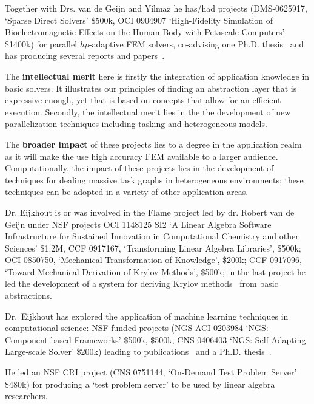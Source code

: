 
Together with Drs. van de Geijn and Yilmaz he has/had projects 
%
(DMS-0625917, `Sparse Direct Solvers' \$500k,
%
OCI 0904907 `High-Fidelity Simulation of Bioelectromagnetic Effects on the Human Body with Petascale Computers' \$1400k)
%
for parallel $hp$-adaptive FEM solvers,
co-advising one Ph.D. thesis~\cite{Kim:2013:dissertation} and has
producing several reports and
papers~\cite{Bientinesi:2010uhm,KimEijkhout:2012Sparse,KimEijkhout:2012GPU,Kim:2013:multilevel}.

The \textbf{intellectual merit} here is firstly the integration of application
knowledge in basic solvers. It illustrates our principles of finding an abstraction
layer that is expressive enough, yet that is based on concepts that allow for 
an efficient execution. Secondly, the intellectual merit lies in the
the development of new parallelization techniques
including tasking and heterogeneous models.

The \textbf{broader impact} of these projects lies to a degree in the application realm
as it will make the use high accuracy FEM available to a larger audience.
Computationally, the impact of these projects lies in the development of techniques
for dealing massive task graphs in heterogeneous environments; these techniques
can be adopted in a variety of other application areas.

%
Dr. Eijkhout is or was involved in the Flame project led by dr. Robert van de Geijn
under NSF projects
%
OCI 1148125 SI2 `A Linear Algebra Software Infrastructure for Sustained Innovation in Computational Chemistry and other Sciences' \$1.2M,
%
CCF 0917167, `Transforming Linear Algebra Libraries', \$500k;
%
OCI 0850750, `Mechanical Transformation of Knowledge', \$200k;
%
CCF 0917096, `Toward Mechanical Derivation of Krylov Methods', \$500k;
%
in the last project he led the development of
a system for deriving Krylov methods~\cite{Eijkhout2010ICCS-krylov}
from basic abstractions.

Dr.\ Eijkhout has explored the application of machine learning
techniques in computational science: NSF-funded projects 
%
(NGS ACI-0203984 `NGS: Component-based Frameworks' \$500k, \$500k, CNS 0406403 `NGS: Self-Adapting Large-scale Solver' \$200k)
%
leading to publications~\cite{Aretal:seamless-sgi,Ba:bomb,Bhowmicketal:application,ibmrd:05sans,DemEtAl:ieeeproc2004,DonEij:iccs2003,EijkFuentes:TOMSmetadata,EijkFuen:architecture,EidDonEij:ipdps2003,EidEijDon:ipdps2004,EijkFuenEidDong:components2005} and a Ph.D. thesis~\cite{Erika:thesis}.

He led an NSF CRI project 
%
(CNS 0751144, `On-Demand Test Problem Server' \$480k)
%
for producing a `test problem server' to be used by
linear algebra researchers.
